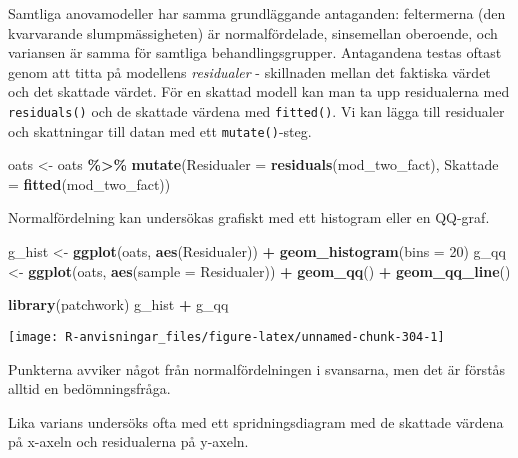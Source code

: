 \documentclass[
]{book}
\newenvironment{Shaded}{\begin{snugshade}}{\end{snugshade}}
\newcommand{\AttributeTok}[1]{\textcolor[rgb]{0.13,0.29,0.53}{#1}}
\newcommand{\DecValTok}[1]{\textcolor[rgb]{0.00,0.00,0.81}{#1}}
\newcommand{\FunctionTok}[1]{\textcolor[rgb]{0.13,0.29,0.53}{\textbf{#1}}}
\newcommand{\NormalTok}[1]{#1}
\newcommand{\OtherTok}[1]{\textcolor[rgb]{0.56,0.35,0.01}{#1}}
\newcommand{\SpecialCharTok}[1]{\textcolor[rgb]{0.81,0.36,0.00}{\textbf{#1}}}
\theoremstyle{definition}
\theoremstyle{definition}
\theoremstyle{definition}
\theoremstyle{definition}
\theoremstyle{remark}
\begin{document}
Samtliga anovamodeller har samma grundläggande antaganden: feltermerna (den kvarvarande slumpmässigheten) är normalfördelade, sinsemellan oberoende, och variansen är samma för samtliga behandlingsgrupper. Antagandena testas oftast genom att titta på modellens \emph{residualer} - skillnaden mellan det faktiska värdet och det skattade värdet. För en skattad modell kan man ta upp residualerna med \texttt{residuals()} och de skattade värdena med \texttt{fitted()}. Vi kan lägga till residualer och skattningar till datan med ett \texttt{mutate()}-steg.

\begin{Shaded}
\begin{Highlighting}[]
\NormalTok{oats }\OtherTok{\textless{}{-}}\NormalTok{ oats }\SpecialCharTok{\%\textgreater{}\%} 
  \FunctionTok{mutate}\NormalTok{(}\AttributeTok{Residualer =} \FunctionTok{residuals}\NormalTok{(mod\_two\_fact),}
         \AttributeTok{Skattade =} \FunctionTok{fitted}\NormalTok{(mod\_two\_fact))}
\end{Highlighting}
\end{Shaded}

Normalfördelning kan undersökas grafiskt med ett histogram eller en QQ-graf.

\begin{Shaded}
\begin{Highlighting}[]
\NormalTok{g\_hist }\OtherTok{\textless{}{-}} \FunctionTok{ggplot}\NormalTok{(oats, }\FunctionTok{aes}\NormalTok{(Residualer)) }\SpecialCharTok{+} \FunctionTok{geom\_histogram}\NormalTok{(}\AttributeTok{bins =} \DecValTok{20}\NormalTok{)}
\NormalTok{g\_qq }\OtherTok{\textless{}{-}} \FunctionTok{ggplot}\NormalTok{(oats, }\FunctionTok{aes}\NormalTok{(}\AttributeTok{sample =}\NormalTok{ Residualer)) }\SpecialCharTok{+} \FunctionTok{geom\_qq}\NormalTok{() }\SpecialCharTok{+} \FunctionTok{geom\_qq\_line}\NormalTok{()}

\FunctionTok{library}\NormalTok{(patchwork)}
\NormalTok{g\_hist }\SpecialCharTok{+}\NormalTok{ g\_qq}
\end{Highlighting}
\end{Shaded}

\begin{center}\texttt{[image: R-anvisningar\_files/figure-latex/unnamed-chunk-304-1]} \end{center}

Punkterna avviker något från normalfördelningen i svansarna, men det är förstås alltid en bedömningsfråga.

Lika varians undersöks ofta med ett spridningsdiagram med de skattade värdena på x-axeln och residualerna på y-axeln.
\end{document}
